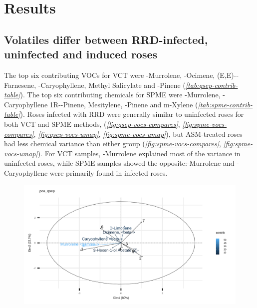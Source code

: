 \documentclass{ufdissertation}[overrideChapters] %
\begin{document}
{\hypertarget{results-1}{%
\section{Results}\label{results-1}}

\hypertarget{volatiles-differ-between-rrd-infected-uninfected-and-induced-roses}{%
\subsection{Volatiles differ between RRD-infected, uninfected and induced roses}\label{volatiles-differ-between-rrd-infected-uninfected-and-induced-roses}}

The top six contributing VOCs for VCT were \textgamma-Murrolene, \textbeta-Ocimene, (E,E)-\textalpha-Farnesene, \textbeta-Caryophyllene, Methyl Salicylate and \textbeta-Pinene (\emph{\ref{tab:qsep-contrib-table}}). The top six contributing chemicals for SPME were \textgamma-Murrolene, \textbeta-Caryophyllene 1R-\textalpha-Pinene, Mesitylene, \textbeta-Pinene and m-Xylene (\emph{\ref{tab:spme-contrib-table}}). Roses infected with RRD were generally similar to uninfected roses for both VCT and SPME methods, (\emph{\ref{fig:qsep-vocs-compares}}, \emph{\ref{fig:spme-vocs-compares}}, \emph{\ref{fig:qsep-vocs-umap}}, \emph{\ref{fig:spme-vocs-umap}}), but ASM-treated roses had less chemical variance than either group (\emph{\ref{fig:spme-vocs-compares}}, \emph{\ref{fig:spme-vocs-umap}}). For VCT samples, \textgamma-Murrolene explained most of the variance in uninfected roses, while SPME samples showed the opposite:\textgamma-Murrolene and \textbeta-Caryophyllene were primarily found in infected roses.
\begin{figure}

{\centering \includegraphics[width=1\linewidth]{figure/rrv_volatiles_biplot_var_pca_qsep} 

}
\end{figure}}
\end{document}
